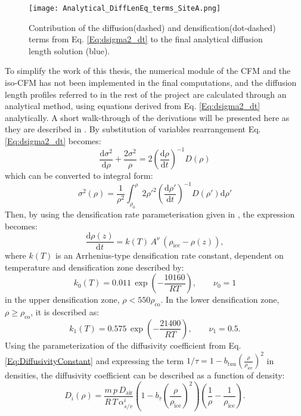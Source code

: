 \documentclass[../../CompleteThesis2/Complete_2ndDraft.tex]{subfiles}
\begin{document}
	\begin{figure}
		\centering
		\texttt{[image: Analytical\_DiffLenEq\_terms\_SiteA.png]}
		\caption{Contribution of the diffusion(dashed) and densification(dot-dashed) terms from Eq. \ref{Eq:dsigma2_dt} to the final analytical diffusion length solution (blue).}
		\label{Fig:ICE_DiffDensTerms}
	\end{figure}
	
	To simplify the work of this thesis, the numerical module of the CFM and the iso-CFM has not been implemented in the final computations, and the diffusion length profiles referred to in the rest of the project are calculated through an analytical method, using equations derived from Eq. \ref{Eq:dsigma2_dt} analytically. A short walk-through of the derivations will be presented here as they are described in \cite[Gkinis et al., 2021]{Gkinis2021}.
	By substitution of variables rearrangement Eq. \ref{Eq:dsigma2_dt} becomes:
	\begin{equation}
		\frac{\text{d}\sigma^2}{\text{d}\rho} + \frac{2\sigma^2}{\rho} = 2\left(\frac{\text{d}\rho}{\text{d}t}\right)^{-1}D(\rho)
		\label{Eq:dsigma_dt_rearrange}
	\end{equation}
	which can be converted to integral form:
	\begin{equation}
		\sigma^2(\rho) = \frac{1}{\rho^2}\int_{\rho_0}^{\rho}2\rho'^2\left(\frac{\text{d}\rho'}{\text{d}t}\right)^{-1}D(\rho')\text{d}\rho'
		\label{Eq:sigma2_rho_integral}
	\end{equation}
	Then, by using the densification rate parameterisation given in \cite[Herron and Langway, 1980]{HerronLangway1980}, the expression becomes:
	\begin{equation}
		\frac{\text{d}\rho(z)}{\text{d}t} = k(T)\, A^{\nu}\, (\rho_{\text{ice}} - \rho(z)),
		\label{Eq:drho_dt}
	\end{equation}
	where $k(T)$ is an Arrhenius-type densification rate constant, dependent on temperature and densification zone described by:
	\begin{equation}
		k_0(T) = 0.011\, \exp\left(-\frac{10160}{RT}\right), \qquad \nu_0 = 1
		\label{Eq:ArrCoeff_Zone1}
	\end{equation}
	in the upper densification zone, $\rho < 550 \rho_{\text{co}}$. In the lower densification zone, $\rho \geq \rho_{\text{co}}$, it is described as:
	\begin{equation}
		k_1(T) = 0.575\, \exp\left(-\frac{21400}{RT}\right), \qquad \nu_1 = 0.5.
		\label{Eq:ArrCoeff_Zone2}
	\end{equation}
	Using the parameterization of the diffusivity coefficient from Eq. \ref{Eq:DiffusivityConstant} and expressing the term $1/\tau = 1-b_{tau}\left(\frac{\rho}{\rho_{\text{ice}}}\right)^2$ in densities, the diffusivity coefficient can be described as a function of density:
	\begin{equation}
		D_i(\rho) = \frac{m \, p \, D_{\text{air}}}{R \, T \, \alpha_{s/v}^i}\left(1-b_{\tau}\left(\frac{\rho}{\rho_{\text{ice}}}\right)^2\right)\left(\frac{1}{\rho} - \frac{1}{\rho_{\text{ice}}}\right).
		\label{Eq:DiffusivityConstant_2}
	\end{equation}
	
\end{document}
